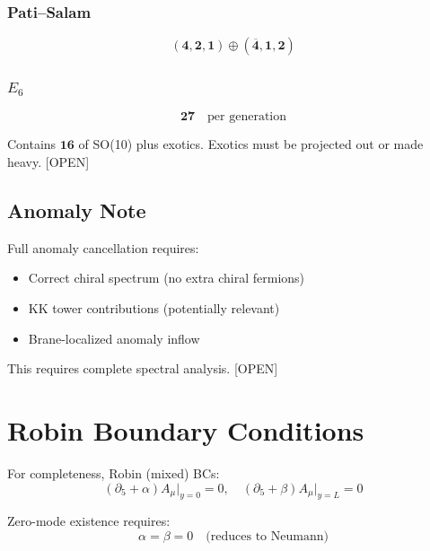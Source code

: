 \documentclass[11pt,a4paper]{article}
\newcommand{\tagOPEN}{\textcolor{red!70!black}{[OPEN]}}
\begin{document}
\subsubsection{Pati--Salam}

\begin{equation}
\label{eq:ps-matter}
(\mathbf{4}, \mathbf{2}, \mathbf{1}) \oplus (\overline{\mathbf{4}}, \mathbf{1}, \mathbf{2})
\end{equation}

\subsubsection{$E_6$}

\begin{equation}
\label{eq:e6-matter}
\mathbf{27} \quad \text{per generation}
\end{equation}

Contains $\mathbf{16}$ of SO(10) plus exotics. Exotics must be projected out
or made heavy. \tagOPEN

\subsection{Anomaly Note}

\begin{openbox}
Full anomaly cancellation requires:
\begin{itemize}
    \item Correct chiral spectrum (no extra chiral fermions)
    \item KK tower contributions (potentially relevant)
    \item Brane-localized anomaly inflow
\end{itemize}
This requires complete spectral analysis. \tagOPEN
\end{openbox}

\section{Robin Boundary Conditions}
\label{app:robin}

For completeness, Robin (mixed) BCs:
\begin{equation}
\label{eq:robin}
(\partial_5 + \alpha) A_\mu \big|_{y=0} = 0, \quad
(\partial_5 + \beta) A_\mu \big|_{y=L} = 0
\end{equation}

Zero-mode existence requires:
\begin{equation}
\label{eq:robin-zero}
\alpha = \beta = 0 \quad \text{(reduces to Neumann)}
\end{equation}
\end{document}
